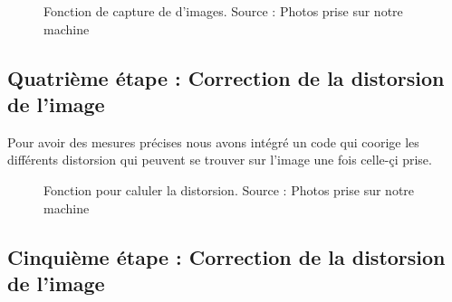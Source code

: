   \begin{figure}[H]%
 	\center%
 	\setlength{\fboxsep}{5pt}%
 	\setlength{\fboxrule}{0.5pt}%
 	\caption[Fonction de capture de d'images]{Fonction de capture de d'images. Source : Photos prise sur notre machine}
 	\label{fig:Fonction de capture de d'images}
 \end{figure}
 
 \subsection{Quatrième étape : Correction de la distorsion de l'image}
 
 Pour avoir des mesures précises nous avons intégré un code qui coorige les différents distorsion qui peuvent se trouver sur l'image une fois celle-çi prise.
 
 \begin{figure}[H]%
 	\center%
 	\setlength{\fboxsep}{5pt}%
 	\setlength{\fboxrule}{0.5pt}%
 	\caption[Fonction pour caluler la distorsion]{Fonction pour caluler la distorsion. Source : Photos prise sur notre machine}
 	\label{fig:Fonction pour caluler la distorsion}
 \end{figure}
 
 \subsection{Cinquième étape : Correction de la distorsion de l'image}
 

